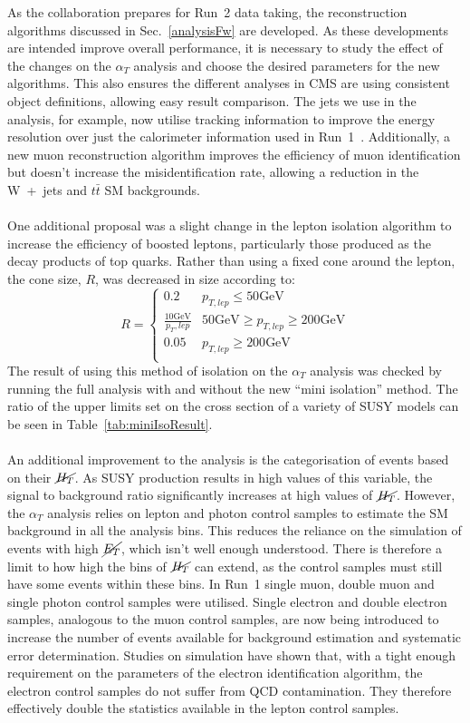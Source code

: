 \noindent As the collaboration prepares for Run~2 data taking, the reconstruction algorithms discussed in Sec.~\ref{analysisFw} are developed. As these developments are intended improve overall performance, it is necessary to study the effect of the changes on the $\alpha_T$ analysis and choose the desired parameters for the new algorithms. This also ensures the different analyses in CMS are using consistent object definitions, allowing easy result comparison. The jets we use in the analysis, for example, now utilise tracking information to improve the energy resolution over just the calorimeter information used in Run~1~\cite{ParticleFlow}. Additionally, a new muon reconstruction algorithm improves the efficiency of muon identification but doesn't increase the misidentification rate, allowing a reduction in the W~+~jets and $t\bar{t}$ SM backgrounds. 
\\\\
One additional proposal was a slight change in the lepton isolation algorithm to increase the efficiency of boosted leptons, particularly those produced as the decay products of top quarks. Rather than using a fixed cone around the lepton, the cone size, $R$, was decreased in size according to:
\begin{equation}
R =
  \begin{cases}
    0.2       & p_{T,lep} \leq 50\textrm{GeV}\\
    \frac{10\textrm{GeV}}{p_T,lep}       & 50\textrm{GeV}\geq p_{T,lep} \geq 200\textrm{GeV}\\
    0.05     &  p_{T,lep} \geq 200\textrm{GeV}\\
  \end{cases}
\end{equation}
The result of using this method of isolation on the $\alpha_T$ analysis was checked by running the full analysis with and without the new ``mini isolation'' method. The ratio of the upper limits set on the cross section of a variety of SUSY models can be seen in Table~\ref{tab:miniIsoResult}. 
\\\\
An additional improvement to the analysis is the categorisation of events based on their $\cancel{H_T}$. As SUSY production results in high values of this variable, the signal to background ratio significantly increases at high values of $\cancel{H_T}$. However, the $\alpha_T$ analysis relies on lepton and photon control samples to estimate the SM background in all the analysis bins. This reduces the reliance on the simulation of events with high $\cancel{E_T}$, which isn't well enough understood. There is therefore a limit to how high the bins of $\cancel{H_T}$ can extend, as the control samples must still have some events within these bins. In Run~1 single muon, double muon and single photon control samples were utilised. Single electron and double electron samples, analogous to the muon control samples, are now being introduced to increase the number of events available for background estimation and systematic error determination. Studies on simulation have shown that, with a tight enough requirement on the parameters of the electron identification algorithm, the electron control samples do not suffer from QCD contamination. They therefore effectively double the statistics available in the lepton control samples.
